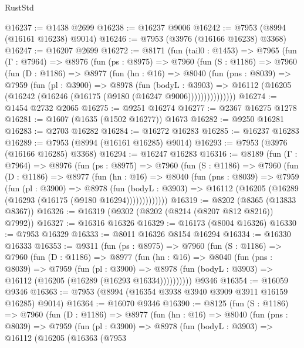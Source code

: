 \begin{lexlean}{RustStd}
\begin{coremodule}
@16237 := @1438 @2699
@16238 := @16237 @9006
@16242 := @7953 (@8994 (@16161 @16238) @9014)
@16246 := @7953 (@3976 (@16166 @16238) @3368)
@16247 := @16207 @2699
@16272 := @8171
    (fun (tail0 : @1453) =>
    @7965
      (fun (Γ : @7964) =>
      @8976
        (fun (ps : @8975) =>
        @7960
          (fun (S : @1186) =>
          @7960
            (fun (D : @1186) =>
            @8977
              (fun (hn : @16) =>
              @8040
                (fun (pns : @8039) =>
                @7959
                  (fun (pl : @3900) =>
                  @8978
                    (fun (bodyL : @3903) =>
                    @16112 (@16205 (@16242 (@16246 (@16175 (@9180 (@16247 @9006)))))))))))))))
@16274 := @1454 @2732 @2065
@16275 := @9251 @16274
@16277 := @2367 @16275 @1278
@16281 := @1607 (@1635 (@1502 @16277)) @1673
@16282 := @9250 @16281
@16283 := @2703 @16282
@16284 := @16272 @16283
@16285 := @16237 @16283
@16289 := @7953 (@8994 (@16161 @16285) @9014)
@16293 := @7953 (@3976 (@16166 @16285) @3368)
@16294 := @16247 @16283
@16316 := @8189
    (fun (Γ : @7964) =>
    @8976
      (fun (ps : @8975) =>
      @7960
        (fun (S : @1186) =>
        @7960
          (fun (D : @1186) =>
          @8977
            (fun (hn : @16) =>
            @8040
              (fun (pns : @8039) =>
              @7959
                (fun (pl : @3900) =>
                @8978
                  (fun (bodyL : @3903) =>
                  @16112 (@16205 (@16289 (@16293 (@16175 (@9180 @16294)))))))))))))
@16319 := @8202 (@8365 (@13833 @8367))
@16326 := @16319 (@9302 (@8202 (@8214 (@8207 @812 @8216)) @7992))
@16327 := @16316 @16326
@16329 := @16173 (@8004 @16326)
@16330 := @7953 @16329
@16333 := @8011 @16326 @8154 @16294
@16334 := @16330 @16333
@16353 := @9311
    (fun (ps : @8975) =>
    @7960
      (fun (S : @1186) =>
      @7960
        (fun (D : @1186) =>
        @8977
          (fun (hn : @16) =>
          @8040
            (fun (pns : @8039) =>
            @7959
              (fun (pl : @3900) =>
              @8978 (fun (bodyL : @3903) => @16112 (@16205 (@16289 (@16293 @16334))))))))))
    @9346
@16354 := @16059 @9346
@16363 := @7953 (@8994 (@16354 @3938 @3940 @3909 @3911 @16159 @16285) @9014)
@16364 := @16070 @9346
@16390 := @8125
    (fun (S : @1186) =>
    @7960
      (fun (D : @1186) =>
      @8977
        (fun (hn : @16) =>
        @8040
          (fun (pns : @8039) =>
          @7959
            (fun (pl : @3900) =>
            @8978
              (fun (bodyL : @3903) =>
              @16112
                (@16205
                  (@16363
                    (@7953

\end{coremodule}
\end{lexlean}
